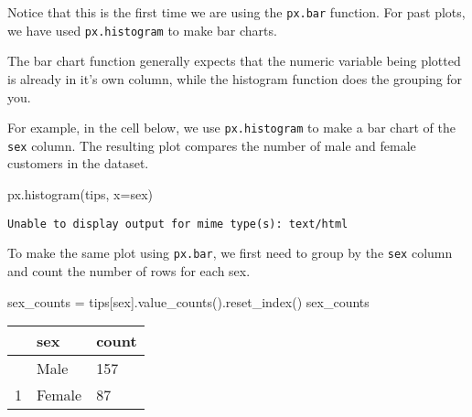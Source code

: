 \documentclass[
  letterpaper,
  DIV=11,
  numbers=noendperiod]{scrreprt}
\newenvironment{Shaded}{\begin{snugshade}}{\end{snugshade}}
\newcommand{\NormalTok}[1]{\textcolor[rgb]{0.00,0.23,0.31}{#1}}
\newcommand{\OperatorTok}[1]{\textcolor[rgb]{0.37,0.37,0.37}{#1}}
\newcommand{\StringTok}[1]{\textcolor[rgb]{0.13,0.47,0.30}{#1}}
\begin{document}
\begin{tcolorbox}[enhanced jigsaw, colframe=quarto-callout-note-color-frame, opacityback=0, titlerule=0mm, bottomrule=.15mm, breakable, leftrule=.75mm, colbacktitle=quarto-callout-note-color!10!white, title=\textcolor{quarto-callout-note-color}{\faInfo}\hspace{0.5em}{Side Note: Difference between \texttt{px.bar} and \texttt{px.histogram}}, rightrule=.15mm, coltitle=black, opacitybacktitle=0.6, colback=white, left=2mm, arc=.35mm, toptitle=1mm, bottomtitle=1mm, toprule=.15mm]

Notice that this is the first time we are using the \texttt{px.bar}
function. For past plots, we have used \texttt{px.histogram} to make bar
charts.

The bar chart function generally expects that the numeric variable being
plotted is already in it's own column, while the histogram function does
the grouping for you.

For example, in the cell below, we use \texttt{px.histogram} to make a
bar chart of the \texttt{sex} column. The resulting plot compares the
number of male and female customers in the dataset.

\begin{Shaded}
\begin{Highlighting}[]
\NormalTok{px.histogram(tips, x}\OperatorTok{=}\StringTok{\textquotesingle{}sex\textquotesingle{}}\NormalTok{)}
\end{Highlighting}
\end{Shaded}

\begin{verbatim}
Unable to display output for mime type(s): text/html
\end{verbatim}

To make the same plot using \texttt{px.bar}, we first need to group by
the \texttt{sex} column and count the number of rows for each sex.

\begin{Shaded}
\begin{Highlighting}[]
\NormalTok{sex\_counts }\OperatorTok{=}\NormalTok{ tips[}\StringTok{\textquotesingle{}sex\textquotesingle{}}\NormalTok{].value\_counts().reset\_index()}
\NormalTok{sex\_counts}
\end{Highlighting}
\end{Shaded}

\begin{longtable}[]{@{}lll@{}}
\toprule\noalign{}
& sex & count \\
\midrule\noalign{}
\endhead
\bottomrule\noalign{}
\endlastfoot
0 & Male & 157 \\
1 & Female & 87 \\
\end{longtable}


\end{tcolorbox}
\end{document}
